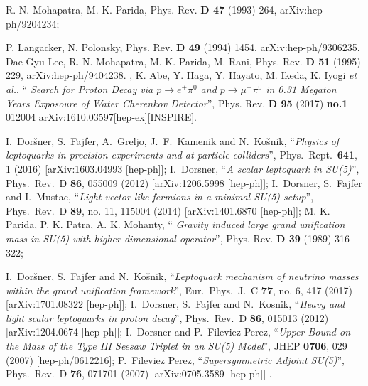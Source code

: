 \documentclass[a4paper,11pt]{article}
\begin{document}
\begin{thebibliography}{99}
 R. N. Mohapatra, M. K. Parida, Phys. Rev. {\bf
  D 47 } (1993) 264, arXiv:hep-ph/9204234; 

 P. Langacker, N. Polonsky, Phys. Rev. {\bf D 49} (1994) 1454, arXiv:hep-ph/9306235.
  Dae-Gyu Lee,
  R. N. Mohapatra, M. K. Parida, M. Rani, Phys. Rev. {\bf D 51} (1995)
  229, arXiv:hep-ph/9404238.
, K. Abe, Y. Haga,
  Y. Hayato, M. Ikeda, K. Iyogi {\it et al.}, `` {\em Search for Proton Decay via
  $p\to e^+\pi^0$ and $ p\to \mu^+\pi^0$ in 0.31 Megaton Years
  Exposoure of Water Cherenkov Detector}'', Phys. Rev. {\bf D 95} 
  (2017) {\bf no.1} 012004 arXiv:1610.03597[hep-ex][INSPIRE].
  
  I.~Doršner, S.~Fajfer, A.~Greljo, J.~F.~Kamenik and N.~Košnik,
  ``{\em Physics of leptoquarks in precision experiments and at particle colliders}'',
  Phys.\ Rept.\  {\bf 641}, 1 (2016)
  [arXiv:1603.04993 [hep-ph]];
 I.~Dorsner,
  ``{\em A scalar leptoquark in SU(5)}'',
  Phys.\ Rev.\ D {\bf 86}, 055009 (2012)
  [arXiv:1206.5998 [hep-ph]];
I.~Dorsner, S.~Fajfer and I.~Mustac,
  ``{\em Light vector-like fermions in a minimal SU(5) setup}'',
  Phys.\ Rev.\ D {\bf 89}, no. 11, 115004 (2014)
  [arXiv:1401.6870 [hep-ph]];
 M. K. Parida, P. K. Patra, A. K. Mohanty, ``{\em
  Gravity induced large grand unification mass in SU(5) with higher
  dimensional operator}'', Phys. Rev. {\bf D 39} (1989) 316-322; 
 
I.~Doršner, S.~Fajfer and N.~Košnik,
  ``{\em Leptoquark mechanism of neutrino masses within the grand unification framework}'',
  Eur.\ Phys.\ J.\ C {\bf 77}, no. 6, 417 (2017)
  [arXiv:1701.08322 [hep-ph]];  
  I.~Dorsner, S.~Fajfer and N.~Kosnik,
  ``{\em Heavy and light scalar leptoquarks in proton decay}'',
  Phys.\ Rev.\ D {\bf 86}, 015013 (2012)
  [arXiv:1204.0674 [hep-ph]]; 
I.~Dorsner and P.~Fileviez Perez,
  ``{\em Upper Bound on the Mass of the Type III Seesaw Triplet in an SU(5) Model}'',
  JHEP {\bf 0706}, 029 (2007)
  [hep-ph/0612216];
P.~Fileviez Perez,
  ``{\em Supersymmetric Adjoint SU(5)}'',
  Phys.\ Rev.\ D {\bf 76}, 071701 (2007)
  [arXiv:0705.3589 [hep-ph]]   .



\end{thebibliography}
\end{document}
